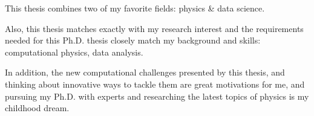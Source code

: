 This thesis combines two of my favorite fields: physics \& data science.

Also, this thesis matches exactly with my research interest and the requirements needed for this Ph.D. thesis closely match my background and skills:  computational physics, data analysis.%

In addition, the new computational challenges presented by this thesis, and thinking about innovative ways to tackle them are great motivations for me, and pursuing my Ph.D. with experts and researching the latest topics of physics is my childhood dream. 
